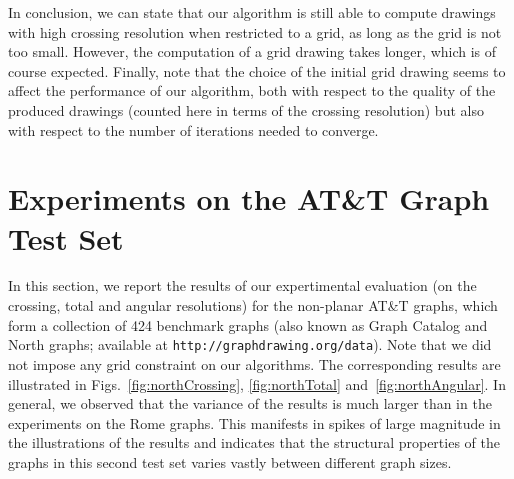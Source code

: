 \documentclass[runningheads]{llncs}
\begin{document}
In conclusion, we can state that our algorithm is still able to compute drawings with high crossing resolution when restricted to a grid, as long as the grid is not too small. However, the computation of a grid drawing takes longer, which is of course expected.
Finally, note that the choice of the initial grid drawing seems to affect the performance of our algorithm, both with respect to the quality of the produced drawings (counted here in terms of the crossing resolution) but also with respect to the number of iterations needed to converge.

\section{Experiments on the AT\&T  Graph Test Set}
\label{app:north}

In this section, we report the results of our expertimental evaluation (on the crossing, total and angular resolutions) for the non-planar AT\&T graphs, which form a collection of 424 benchmark graphs (also known as Graph Catalog and North graphs; available at \texttt{http://graphdrawing.org/data}). Note that we did not impose any grid constraint on our algorithms. The corresponding results are illustrated in Figs.~\ref{fig:northCrossing}, \ref{fig:northTotal} and~\ref{fig:northAngular}. In general, we observed that the variance of the results is much larger than in the experiments on the Rome graphs. This manifests in spikes of large magnitude in the illustrations of the results and indicates that the structural properties of the graphs in this second test set varies vastly between different graph sizes.
\end{document}
